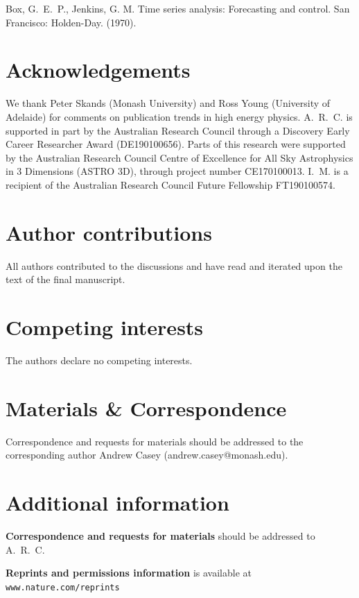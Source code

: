 \documentclass[a4paper,12pt]{article}
\begin{document}
 
\begin{thebibliography}{10}

\setcounter{enumiv}{16}

{Box, G.~E.~P., Jenkins, G. M.} Time series analysis: Forecasting and control. San Francisco: Holden-Day. \newblock (1970).

\end{thebibliography}


\section*{Acknowledgements}
We thank Peter Skands (Monash University) 
	 and Ross Young (University of Adelaide) 
for comments on publication trends in high energy physics.
A.~R.~C. is supported in part by the Australian Research Council through a Discovery Early Career Researcher Award (DE190100656). 
Parts of this research were supported by the Australian Research Council Centre of Excellence for All Sky Astrophysics in 3 Dimensions (ASTRO 3D), through project number CE170100013.
I.~M. is a recipient of the Australian Research Council Future Fellowship FT190100574.


\section*{Author contributions}

All authors contributed to the discussions and have read and iterated upon the text of the final manuscript. 

\section*{Competing interests}
The authors declare no competing interests. 

\section*{Materials \& Correspondence}
Correspondence and requests for materials should be addressed to the corresponding author Andrew Casey (andrew.casey@monash.edu).

\section*{Additional information}


\noindent\textbf{Correspondence and requests for materials} should be addressed to A.~R.~C.

\noindent\textbf{Reprints and permissions information} is available at {\tt\small www.nature.com/reprints}
\end{document}
